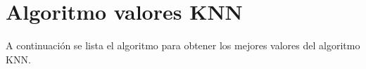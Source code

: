 \chapter{Algoritmo valores KNN}
\label{cap:Algoritmo valores KNN}

A continuación se lista el algoritmo para obtener los mejores valores del algoritmo KNN.

